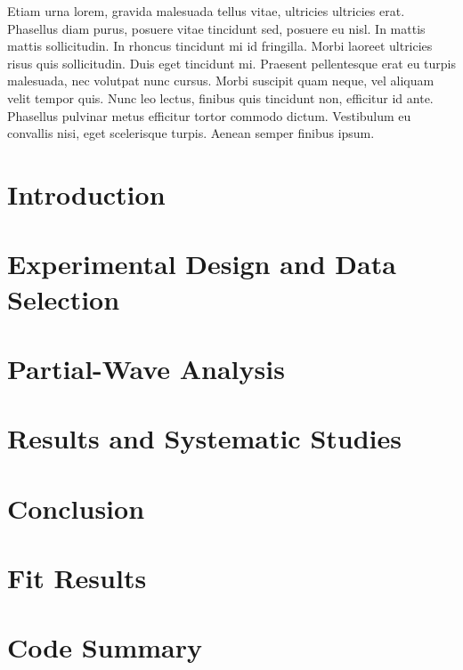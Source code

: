 \documentclass[final]{memoir}
\begin{document}
Etiam urna lorem, gravida malesuada tellus vitae, ultricies ultricies erat. Phasellus diam purus, posuere vitae tincidunt sed, posuere eu nisl. In mattis mattis sollicitudin. In rhoncus tincidunt mi id fringilla. Morbi laoreet ultricies risus quis sollicitudin. Duis eget tincidunt mi. Praesent pellentesque erat eu turpis malesuada, nec volutpat nunc cursus. Morbi suscipit quam neque, vel aliquam velit tempor quis. Nunc leo lectus, finibus quis tincidunt non, efficitur id ante. Phasellus pulvinar metus efficitur tortor commodo dictum. Vestibulum eu convallis nisi, eget scelerisque turpis. Aenean semper finibus ipsum.
\clearpage
\begin{KeepFromToc}
    \setcounter{tocdepth}{2}
    \renewcommand{\contentsname}{Table of Contents}
    \tableofcontents
\end{KeepFromToc}
\thispagestyle{empty}
\mainmatter
\chapter{Introduction}

\chapter{Experimental Design and Data Selection}

\chapter{Partial-Wave Analysis}\label{ch:partial-wave-analysis}

\chapter{Results and Systematic Studies}

\chapter{Conclusion}


\appendix
\chapter{Fit Results}

\chapter{Code Summary}


\backmatter
\printbibliography
\newpage
\end{document}
